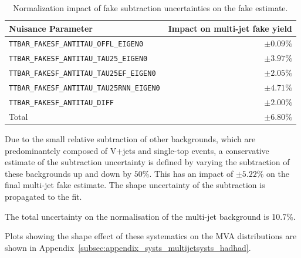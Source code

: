 \begin{table}[htbp]
  \centering
  \begin{tabular}{lr}
    \toprule
    Nuisance Parameter & Impact on multi-jet fake yield \\
    \midrule
    \texttt{TTBAR\_FAKESF\_ANTITAU\_OFFL\_EIGEN0} & $\pm 0.09 \%$ \\
    \texttt{TTBAR\_FAKESF\_ANTITAU\_TAU25\_EIGEN0} & $\pm 3.97 \%$ \\
    \texttt{TTBAR\_FAKESF\_ANTITAU\_TAU25EF\_EIGEN0} & $\pm 2.05 \%$ \\
    \texttt{TTBAR\_FAKESF\_ANTITAU\_TAU25RNN\_EIGEN0} & $\pm 4.71 \%$ \\
    \texttt{TTBAR\_FAKESF\_ANTITAU\_DIFF} & $\pm 2.00 \%$ \\
    \midrule
    Total & $\pm 6.80 \%$ \\
    \bottomrule
  \end{tabular}
  \caption{Normalization impact of fake \tauhad subtraction uncertainties on the fake estimate.}
  \label{tab:systematics_multijet_hh_fake_ttbar_subtraction}
\end{table}

Due to the small relative subtraction of other backgrounds, which are
predominantely composed of V+jets and single-top events, a
conservative estimate of the subtraction uncertainty is defined by
varying the subtraction of these backgrounds up and down by $50
\%$. This has an impact of $\pm 5.22 \%$ on the final multi-jet fake
estimate. The shape uncertainty of the subtraction is propagated to
the fit.

The total uncertainty on the normalisation of the multi-jet background is 10.7\%.

Plots showing the shape effect of these systematics on the MVA distributions are shown in Appendix~\ref{subsec:appendix_systs_multijetsysts_hadhad}.
